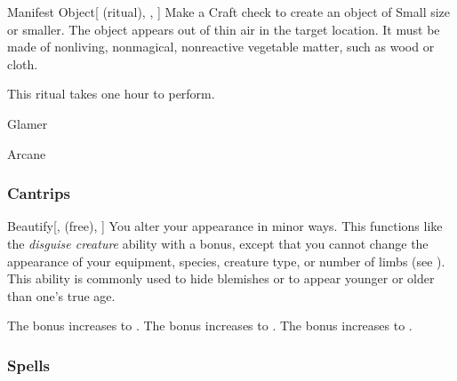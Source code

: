 \lowercase{\hypertarget{spell:Manifest Object}{}}\label{spell:Manifest Object}
\begin{attuneability}[Rank 3]{\hypertarget{spell:Manifest Object}{Manifest Object}}[ (ritual), , ]
Make a Craft check to create an object of Small size or smaller.
The object appears out of thin air in the target location.
It must be made of nonliving, nonmagical, nonreactive vegetable matter, such as wood or cloth.

This ritual takes one hour to perform.
\end{attuneability}
\vspace{0.25em}


\newpage
\begin{spellsection}{Glamer}

\begin{spellheader}
\end{spellheader}


 Arcane

\subsubsection{Cantrips}


\begin{freeability}{Beautify}[,  (free), ]
You alter your appearance in minor ways.
This functions like the \textit{disguise creature}  ability with a  bonus, except that you cannot change the appearance of your equipment, species, creature type, or number of limbs (see ).
This ability is commonly used to hide blemishes or to appear younger or older than one's true age.

\rankline
{} The bonus increases to .
 The bonus increases to .
 The bonus increases to .
\end{freeability}

\end{spellsection}


\subsubsection{Spells}


